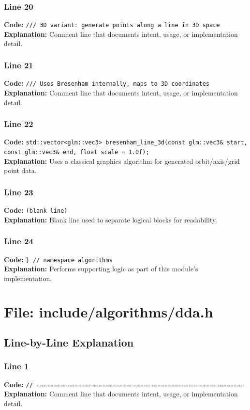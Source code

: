 \documentclass[11pt,a4paper]{article}
\begin{document}
\subsubsection*{Line 20}
\textbf{Code:} \verb|/// 3D variant: generate points along a line in 3D space|\\
\textbf{Explanation:} Comment line that documents intent, usage, or implementation detail.

\subsubsection*{Line 21}
\textbf{Code:} \verb|/// Uses Bresenham internally, maps to 3D coordinates|\\
\textbf{Explanation:} Comment line that documents intent, usage, or implementation detail.

\subsubsection*{Line 22}
\textbf{Code:} \verb|std::vector<glm::vec3> bresenham_line_3d(const glm::vec3& start, const glm::vec3& end, float scale = 1.0f);|\\
\textbf{Explanation:} Uses a classical graphics algorithm for generated orbit/axis/grid point data.

\subsubsection*{Line 23}
\textbf{Code:} \texttt{(blank line)}\\
\textbf{Explanation:} Blank line used to separate logical blocks for readability.

\subsubsection*{Line 24}
\textbf{Code:} \verb|} // namespace algorithms|\\
\textbf{Explanation:} Performs supporting logic as part of this module's implementation.

\newpage
\section{File: include/algorithms/dda.h}
\subsection{Line-by-Line Explanation}
\subsubsection*{Line 1}
\textbf{Code:} \verb|// ============================================================|\\
\textbf{Explanation:} Comment line that documents intent, usage, or implementation detail.
\end{document}
